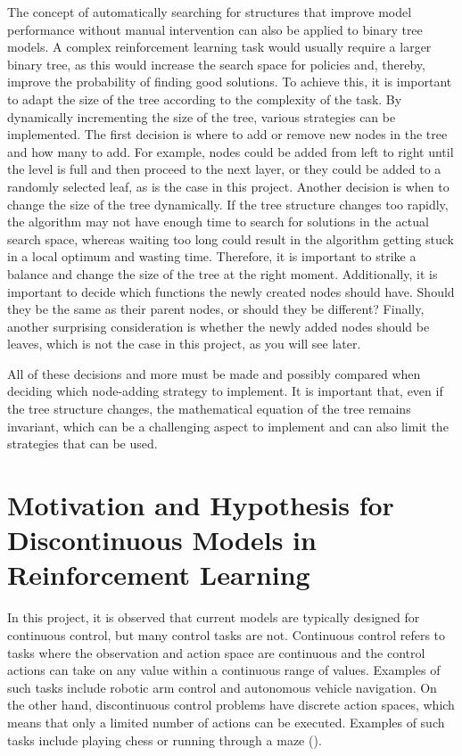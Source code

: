 The concept of automatically searching for structures that improve model performance without manual intervention can also be applied to binary tree models. A complex reinforcement learning task would usually require a larger binary tree, as this would increase the search space for policies and, thereby, improve the probability of finding good solutions. To achieve this, it is important to adapt the size of the tree according to the complexity of the task. By dynamically incrementing the size of the tree, various strategies can be implemented. The first decision is where to add or remove new nodes in the tree and how many to add. For example, nodes could be added from left to right until the level is full and then proceed to the next layer, or they could be added to a randomly selected leaf, as is the case in this project. Another decision is when to change the size of the tree dynamically. If the tree structure changes too rapidly, the algorithm may not have enough time to search for solutions in the actual search space, whereas waiting too long could result in the algorithm getting stuck in a local optimum and wasting time. Therefore, it is important to strike a balance and change the size of the tree at the right moment. Additionally, it is important to decide which functions the newly created nodes should have. Should they be the same as their parent nodes, or should they be different? Finally, another surprising consideration is whether the newly added nodes should be leaves, which is not the case in this project, as you will see later.

All of these decisions and more must be made and possibly compared when deciding which node-adding strategy to implement. It is important that, even if the tree structure changes, the mathematical equation of the tree remains invariant, which can be a challenging aspect to implement and can also limit the strategies that can be used.


\section{Motivation and Hypothesis for Discontinuous Models in Reinforcement Learning}

In this project, it is observed that current models are typically designed for continuous control, but many control tasks are not. Continuous control refers to tasks where the observation and action space are continuous and the control actions can take on any value within a continuous range of values. Examples of such tasks include robotic arm control and autonomous vehicle navigation. On the other hand, discontinuous control problems have discrete action spaces, which means that only a limited number of actions can be executed. Examples of such tasks include playing chess or running through a maze (\cite{sutton_reinforcement_2018}).

